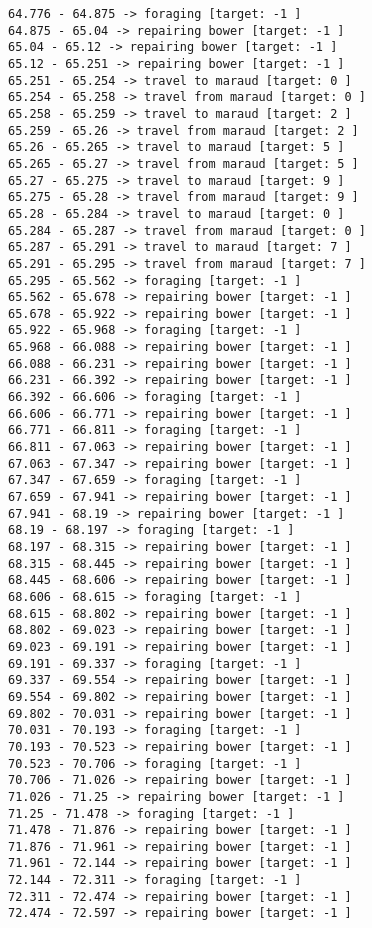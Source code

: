 \documentclass[11pt]{article}
\begin{document}
\begin{Verbatim}[commandchars=\\\{\}]
64.776 - 64.875 -> foraging [target: -1 ]
64.875 - 65.04 -> repairing bower [target: -1 ]
65.04 - 65.12 -> repairing bower [target: -1 ]
65.12 - 65.251 -> repairing bower [target: -1 ]
65.251 - 65.254 -> travel to maraud [target: 0 ]
65.254 - 65.258 -> travel from maraud [target: 0 ]
65.258 - 65.259 -> travel to maraud [target: 2 ]
65.259 - 65.26 -> travel from maraud [target: 2 ]
65.26 - 65.265 -> travel to maraud [target: 5 ]
65.265 - 65.27 -> travel from maraud [target: 5 ]
65.27 - 65.275 -> travel to maraud [target: 9 ]
65.275 - 65.28 -> travel from maraud [target: 9 ]
65.28 - 65.284 -> travel to maraud [target: 0 ]
65.284 - 65.287 -> travel from maraud [target: 0 ]
65.287 - 65.291 -> travel to maraud [target: 7 ]
65.291 - 65.295 -> travel from maraud [target: 7 ]
65.295 - 65.562 -> foraging [target: -1 ]
65.562 - 65.678 -> repairing bower [target: -1 ]
65.678 - 65.922 -> repairing bower [target: -1 ]
65.922 - 65.968 -> foraging [target: -1 ]
65.968 - 66.088 -> repairing bower [target: -1 ]
66.088 - 66.231 -> repairing bower [target: -1 ]
66.231 - 66.392 -> repairing bower [target: -1 ]
66.392 - 66.606 -> foraging [target: -1 ]
66.606 - 66.771 -> repairing bower [target: -1 ]
66.771 - 66.811 -> foraging [target: -1 ]
66.811 - 67.063 -> repairing bower [target: -1 ]
67.063 - 67.347 -> repairing bower [target: -1 ]
67.347 - 67.659 -> foraging [target: -1 ]
67.659 - 67.941 -> repairing bower [target: -1 ]
67.941 - 68.19 -> repairing bower [target: -1 ]
68.19 - 68.197 -> foraging [target: -1 ]
68.197 - 68.315 -> repairing bower [target: -1 ]
68.315 - 68.445 -> repairing bower [target: -1 ]
68.445 - 68.606 -> repairing bower [target: -1 ]
68.606 - 68.615 -> foraging [target: -1 ]
68.615 - 68.802 -> repairing bower [target: -1 ]
68.802 - 69.023 -> repairing bower [target: -1 ]
69.023 - 69.191 -> repairing bower [target: -1 ]
69.191 - 69.337 -> foraging [target: -1 ]
69.337 - 69.554 -> repairing bower [target: -1 ]
69.554 - 69.802 -> repairing bower [target: -1 ]
69.802 - 70.031 -> repairing bower [target: -1 ]
70.031 - 70.193 -> foraging [target: -1 ]
70.193 - 70.523 -> repairing bower [target: -1 ]
70.523 - 70.706 -> foraging [target: -1 ]
70.706 - 71.026 -> repairing bower [target: -1 ]
71.026 - 71.25 -> repairing bower [target: -1 ]
71.25 - 71.478 -> foraging [target: -1 ]
71.478 - 71.876 -> repairing bower [target: -1 ]
71.876 - 71.961 -> repairing bower [target: -1 ]
71.961 - 72.144 -> repairing bower [target: -1 ]
72.144 - 72.311 -> foraging [target: -1 ]
72.311 - 72.474 -> repairing bower [target: -1 ]
72.474 - 72.597 -> repairing bower [target: -1 ]

\end{Verbatim}
\end{document}
